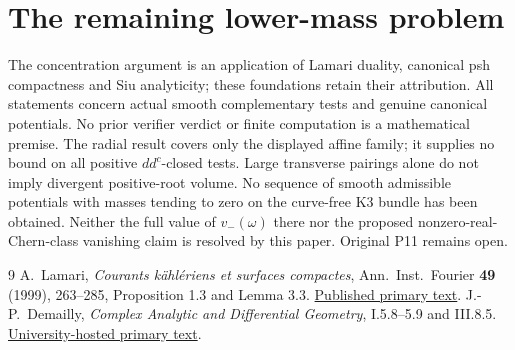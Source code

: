 \documentclass[11pt]{article}
\theoremstyle{remark}\newtheorem{remark}{Remark}
\newcommand{\ddc}{dd^c}
\begin{document}
\section{The remaining lower-mass problem}
The concentration argument is an application of Lamari duality,
canonical psh compactness and Siu analyticity; these foundations retain
their attribution. All statements concern actual smooth complementary
tests and genuine canonical potentials. No prior verifier verdict or
finite computation is a mathematical premise.
The radial result covers only the displayed affine family; it supplies
no bound on all positive $\ddc$-closed tests. Large transverse pairings
alone do not imply divergent positive-root volume. No sequence of smooth
admissible potentials with masses tending to zero on the curve-free
K3 bundle has been obtained. Neither the full value of $v_-(\omega)$
there nor the proposed nonzero-real-Chern-class vanishing claim is
resolved by this paper. Original P11 remains open.

\begin{thebibliography}{9}
 A.~Lamari, \emph{Courants k\"ahl\'eriens et surfaces
compactes}, Ann.~Inst.~Fourier \textbf{49} (1999), 263--285,
Proposition 1.3 and Lemma 3.3.
\href{https://www.numdam.org/article/AIF_1999__49_1_263_0.pdf}{Published primary text}.
 J.-P.~Demailly, \emph{Complex Analytic and Differential
Geometry}, I.5.8--5.9 and III.8.5.
\href{https://www-fourier.univ-grenoble-alpes.fr/~demailly/manuscripts/agbook.pdf}{University-hosted primary text}.
\end{thebibliography}
\end{document}
